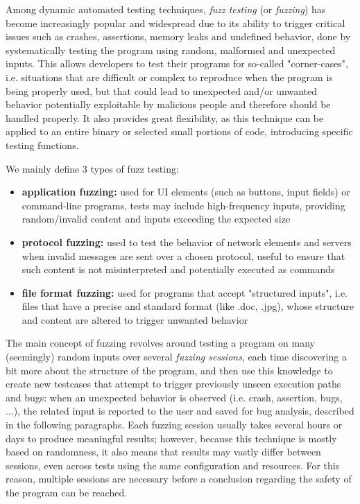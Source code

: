 Among dynamic automated testing techniques, \textit{fuzz testing} (or \textit{fuzzing}) has become increasingly popular and widespread due to its ability to trigger critical issues such as crashes, assertions, memory leaks and undefined behavior, done by systematically testing the program using random, malformed and unexpected inputs. This allows developers to test their programs for so-called "corner-cases", i.e. situations that are difficult or complex to reproduce when the program is being properly used, but that could lead to unexpected and/or unwanted behavior potentially exploitable by malicious people and therefore should be handled properly. It also provides great flexibility, as this technique can be applied to an entire binary or selected small portions of code, introducing specific testing functions.

\newpage
We mainly define 3 types of fuzz testing:
\begin{itemize}
    \item \textbf{application fuzzing:} used for UI elements (such as buttons, input fields) or command-line programs, tests may include high-frequency inputs, providing random/invalid content and inputs exceeding the expected size
    \item \textbf{protocol fuzzing:} used to test the behavior of network elements and servers when invalid messages are sent over a chosen protocol, useful to ensure that such content is not misinterpreted and potentially executed as commands
    \item  \textbf{file format fuzzing:} used for programs that accept "structured inputs", i.e. files that have a precise and standard format (like .doc, .jpg), whose structure and content are altered to trigger unwanted behavior
\end{itemize}

The main concept of fuzzing revolves around testing a program on many (seemingly) random inputs over several \textit{fuzzing sessions}, each time discovering a bit more about the structure of the program, and then use this knowledge to create new testcases that attempt to trigger previously unseen execution paths and bugs: when an unexpected behavior is observed (i.e. crash, assertion, bugs, ...), the related input is reported to the user and saved for bug analysis, described in the following paragraphs. 
Each fuzzing session usually takes several hours or days to produce meaningful results; however, because this technique is mostly based on randomness, it also means that results may vastly differ between sessions, even across tests using the same configuration and resources. For this reason, multiple sessions are necessary before a conclusion regarding the safety of the program can be reached.

